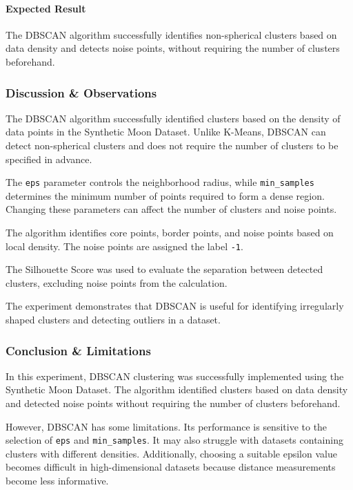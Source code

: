 \documentclass[a4paper,11pt]{article}
\begin{document}
\paragraph{Expected Result}
The DBSCAN algorithm successfully identifies non-spherical clusters based on data density and detects noise points, without requiring the number of clusters beforehand.

\subsubsection{Discussion \& Observations}

The DBSCAN algorithm successfully identified clusters based on the density of data points in the Synthetic Moon Dataset. Unlike K-Means, DBSCAN can detect non-spherical clusters and does not require the number of clusters to be specified in advance.

The \texttt{eps} parameter controls the neighborhood radius, while \texttt{min\_samples} determines the minimum number of points required to form a dense region. Changing these parameters can affect the number of clusters and noise points.

The algorithm identifies core points, border points, and noise points based on local density. The noise points are assigned the label \texttt{-1}.

The Silhouette Score was used to evaluate the separation between detected clusters, excluding noise points from the calculation.

The experiment demonstrates that DBSCAN is useful for identifying irregularly shaped clusters and detecting outliers in a dataset.

\subsubsection{Conclusion \& Limitations}

In this experiment, DBSCAN clustering was successfully implemented using the Synthetic Moon Dataset. The algorithm identified clusters based on data density and detected noise points without requiring the number of clusters beforehand.

However, DBSCAN has some limitations. Its performance is sensitive to the selection of \texttt{eps} and \texttt{min\_samples}. It may also struggle with datasets containing clusters with different densities. Additionally, choosing a suitable epsilon value becomes difficult in high-dimensional datasets because distance measurements become less informative.
\end{document}
